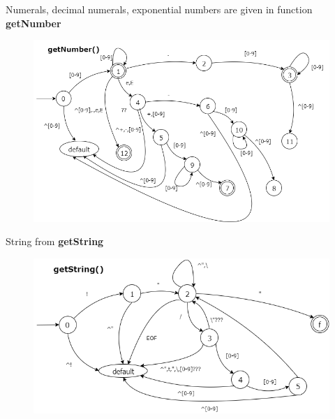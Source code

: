 \documentclass[12pt,a4paper,titlepage]{report}
\begin{document}
\begin{justify}
Numerals, decimal numerals, exponential numbers are given in function \textbf{getNumber}
\end{justify}

\vspace{0.3cm}

\begin{figure}
  \begin{center}
    \includegraphics[width=1.0\textwidth]{img/getNumber.png}
  \end{center}
\end{figure}


\begin{justify}
String from \textbf{getString}
\end{justify}


\begin{figure}
  \begin{center}
    \includegraphics[width=1.0\textwidth]{img/getString.png}
  \end{center}
\end{figure}
\end{document}
